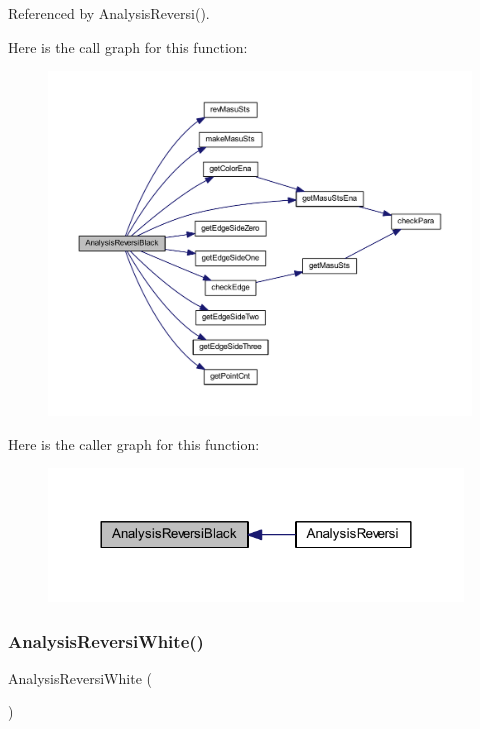 Referenced by Analysis\+Reversi().

Here is the call graph for this function\+:
\nopagebreak
\begin{figure}[H]
\begin{center}
\leavevmode
\includegraphics[width=350pt]{class_reversi_a471972ec549188f7eb701d57e14ae7a1_cgraph}
\end{center}
\end{figure}
Here is the caller graph for this function\+:
\nopagebreak
\begin{figure}[H]
\begin{center}
\leavevmode
\includegraphics[width=312pt]{class_reversi_a471972ec549188f7eb701d57e14ae7a1_icgraph}
\end{center}
\end{figure}
\mbox{\label{class_reversi_a3c30afb2509b0782b1c22a8770c68c48}} 
\subsubsection{\texorpdfstring{Analysis\+Reversi\+White()}{AnalysisReversiWhite()}}
{\footnotesize\ttfamily Analysis\+Reversi\+White (\begin{DoxyParamCaption}{ }\end{DoxyParamCaption})\hspace{0.3cm}{\ttfamily [private]}}



